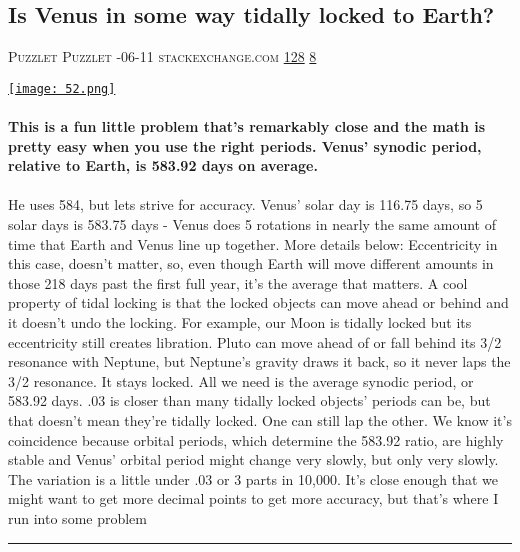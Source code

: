 \documentclass[10pt,a4paper]{article}
\begin{document}
\begin{multicols*}{2}
\begin{minipage}{\linewidth}
\subsection{Is Venus in some way tidally locked to Earth?}
\textsc{\footnotesize
{\scriptsize\faUser}\space 
Puzzlet Puzzlet 
{\scriptsize\faCalendar}-06-11 
{\scriptsize\faGlobe}\space 
stackexchange.com 
{\scriptsize\faThumbsOUp}\space 
\href{http://news.ycombinator.com/item?id=37118114\&utm\_term=comment}{128} 
{\scriptsize\faComments}\space 
\href{http://news.ycombinator.com/item?id=37118114\&utm\_term=comment}{8} 
}
\par\medskip\noindent
\href{https://astronomy.stackexchange.com/questions/36488/is-venus-in-some-way-tidally-locked-to-earth?utm\_source=hackernewsletter\&utm\_medium=email\&utm\_term=learn}{
    \texttt{[image: 52.png]}
}
\end{minipage}
\paragraph{}
\textbf{This is a fun little problem that's remarkably close and the math is pretty easy when you use the right periods.
Venus' synodic period, relative to Earth, is 583.92 days on average.}
\paragraph{}
 He uses 584, but lets strive for accuracy. Venus' solar day is 116.75 days, so 5 solar days is 583.75 days - Venus does 5 rotations in nearly the same amount of time that Earth and Venus line up together.
More details below:
Eccentricity in this case, doesn't matter, so, even though Earth will move different amounts in those 218 days past the first full year, it's the average that matters.
A cool property of tidal locking is that the locked objects can move ahead or behind and it doesn't undo the locking. For example, our Moon is tidally locked but its eccentricity still creates libration. Pluto can move ahead of or fall behind its 3/2 resonance with Neptune, but Neptune's gravity draws it back, so it never laps the 3/2 resonance. It stays locked. All we need is the average synodic period, or 583.92 days.
.03 is closer than many tidally locked objects' periods can be, but that doesn't mean they're tidally locked. One can still lap the other.
We know it's coincidence because orbital periods, which determine the 583.92 ratio, are highly stable and Venus' orbital period might change very slowly, but only very slowly.
The variation is a little under .03 or 3 parts in 10,000. It's close enough that we might want to get more decimal points to get more accuracy, but that's where I run into some problem
\par\noindent\textcolor{red}{\rule{\linewidth}{0.2mm}}
\vfill
\null
\noindent\begin{minipage}{\linewidth}

\end{minipage}
\end{multicols*}
\end{document}
